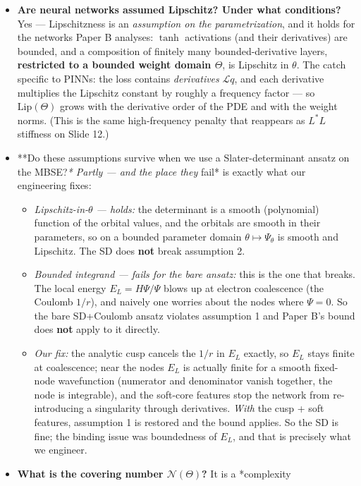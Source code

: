 \documentclass[11pt]{article}
\begin{document}
\begin{itemize}
\item \textbf{Are neural networks assumed Lipschitz? Under what conditions?} Yes ---
Lipschitzness is an \emph{assumption on the parametrization}, and it holds for
the networks Paper B analyses: $\tanh$ activations (and their derivatives)
are bounded, and a composition of finitely many bounded-derivative layers,
\textbf{restricted to a bounded weight domain $\Theta$}, is Lipschitz in
$\theta$. The catch specific to PINNs: the loss contains \emph{derivatives}
$\mathcal L q$, and each derivative multiplies the Lipschitz constant by
roughly a frequency factor --- so $\mathrm{Lip}(\Theta)$ grows with the
derivative order of the PDE and with the weight norms. (This is the same
high-frequency penalty that reappears as $L^*L$ stiffness on Slide 12.)
\item **Do these assumptions survive when we use a Slater-determinant ansatz on
the MBSE?\emph{* Partly --- and the place they }fail* is exactly what our
engineering fixes:
\begin{itemize}
\item \emph{Lipschitz-in-$\theta$ --- holds:} the determinant is a smooth (polynomial)
function of the orbital values, and the orbitals are smooth in their
parameters, so on a bounded parameter domain $\theta \mapsto \Psi_\theta$
is smooth and Lipschitz. The SD does \textbf{not} break assumption 2.
\item \emph{Bounded integrand --- fails for the bare ansatz:} this is the one that
breaks. The local energy $E_L = H\Psi/\Psi$ blows up at electron
coalescence (the Coulomb $1/r$), and naively one worries about the
nodes where $\Psi = 0$. So the bare SD+Coulomb ansatz violates
assumption 1 and Paper B's bound does \textbf{not} apply to it directly.
\item \emph{Our fix:} the analytic cusp cancels the $1/r$ in $E_L$ exactly, so
$E_L$ stays finite at coalescence; near the nodes $E_L$ is actually
finite for a smooth fixed-node wavefunction (numerator and denominator
vanish together, the node is integrable), and the soft-core features
stop the network from re-introducing a singularity through derivatives.
\emph{With} the cusp + soft features, assumption 1 is restored and the bound
applies. So the SD is fine; the binding issue was boundedness of $E_L$,
and that is precisely what we engineer.
\end{itemize}
\item \textbf{What is the covering number $\mathcal N(\Theta)$?} It is a *complexity

\end{itemize}
\end{document}
